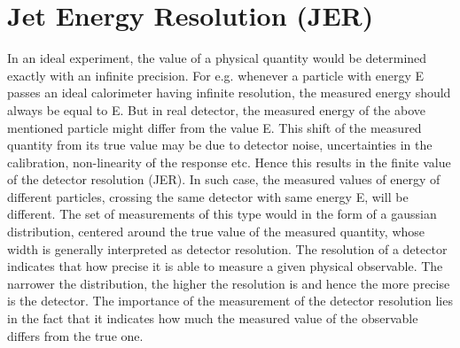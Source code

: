\section{Jet Energy Resolution (JER)}
\label{sec:Resolution}
In an ideal experiment, the value of a physical quantity would be determined exactly with an infinite precision. For e.g. whenever a particle with energy E passes an ideal calorimeter having infinite resolution, the measured energy should always be equal to E. But in real detector, the measured energy of the above mentioned particle might differ from the value E. This shift of the measured quantity from its true value may be due to detector noise, uncertainties in the calibration, non-linearity of the response etc. Hence this results in the finite value of the detector resolution (JER). In such case, the measured values of energy of different particles, crossing the same detector with same energy E, will be different. The set of measurements of this type would in the form of a gaussian distribution, centered around the true value of the measured quantity, whose width is generally interpreted as detector resolution. The resolution of a detector indicates that how precise it is able to measure a given physical observable. The narrower the distribution, the higher the resolution is and hence the more precise is the detector. The importance of the measurement of the detector resolution lies in the fact that it indicates how much the measured value of the observable differs from the true one. %

